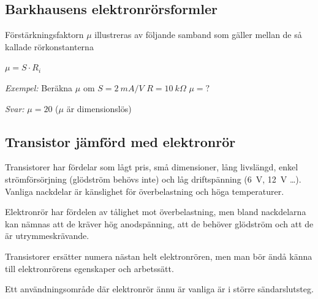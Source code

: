 \subsection{Barkhausens elektronrörsformler}

Förstärkningsfaktorn \(\mu \) illustreras av följande samband som gäller mellan de så kallade rörkonstanterna

\(\mu = S \cdot R_i\)

\emph{Exempel:}
Beräkna \(\mu\)  om \(S = 2\ mA/V\) \(R = 10\ k\Omega\) \(\mu = ?\)

\emph{Svar:} \(\mu = 20\) (\(\mu\)  är dimensionslös)

\subsection{Transistor jämförd med elektronrör}

Transistorer har fördelar som lågt pris, små dimensioner, lång livslängd, enkel strömförsörjning (glödström behövs inte) och låg driftspänning (6~V, 12~V \ldots ). Vanliga nackdelar är känslighet för
överbelastning och höga temperaturer.

Elektronrör har fördelen av tålighet mot överbelastning, men bland nackdelarna kan nämnas att de kräver hög anodspänning, att de behöver glödström och att de är utrymmeskrävande.

Transistorer ersätter numera nästan helt elektronrören, men man bör ändå känna till elektronrörens egenskaper och arbetssätt.

Ett användningsområde där elektronrör ännu är vanliga är i större sändarslutsteg.